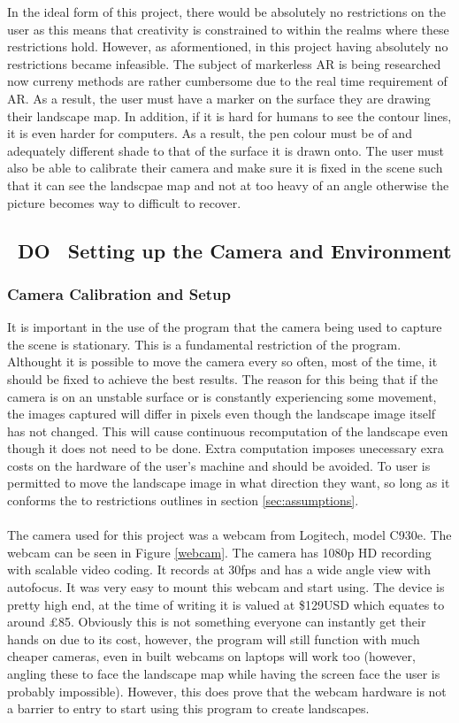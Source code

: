 \documentclass[11pt]{article}
\begin{document}
In the ideal form of this project, there would be absolutely no
restrictions on the user as this means that creativity is constrained
to within the realms where these restrictions hold. However, as 
aformentioned, in this project having absolutely no restrictions became
infeasible. The subject of markerless AR is being researched now curreny 
methods are rather cumbersome due to the real time requirement of AR. As
a result, the user must have a marker on the surface they are drawing their
landscape map. In addition, if it is hard for humans to see the contour
lines, it is even harder for computers. As a result, the pen colour must
be of and adequately different shade to that of the surface it is drawn onto.
The user must also be able to calibrate their camera and make sure it
is fixed in the scene such that it can see the landscpae map and not at
too heavy of an angle otherwise the picture becomes way to difficult to 
recover.

\subsection{~DO~ Setting up the Camera and Environment}
\subsubsection{Camera Calibration and Setup}
It is important in the use of the program that the camera being used to
capture the scene is stationary. This is a fundamental restriction of the 
program. Althought it is possible to move the camera every so often,
most of the time, it should be fixed to achieve the best results. The reason
for this being that if the camera is on an unstable surface or is constantly
experiencing some movement, the images captured will differ in pixels even though
the landscape image itself has not changed. This will cause continuous
recomputation of the landscape even though it does not need to be done. Extra
computation imposes unecessary exra costs on the hardware of the user's machine
and should be avoided. To user is permitted to move the landscape image in 
what direction they want, so long as it conforms the to restrictions
outlines in section \ref{sec:assumptions}.\\
\\
The camera used for this project was a webcam from Logitech, model C930e.
The webcam can be seen in Figure \ref{webcam}. The camera has 1080p HD 
recording with scalable video coding. It records at 30fps and has a wide 
angle view with autofocus. It was very easy to mount this webcam and start
using. The device is pretty high end, at the time of writing it is valued
at \$129USD which equates to around £85. Obviously this is not something
everyone can instantly get their hands on due to its cost, however, the
program will still function with much cheaper cameras, even in built
webcams on laptops will work too (however, angling these to face the 
landscape map while having the screen face the user is probably impossible).
However, this does prove that the webcam hardware is not a barrier to 
entry to start using this program to create landscapes. 
\end{document}
